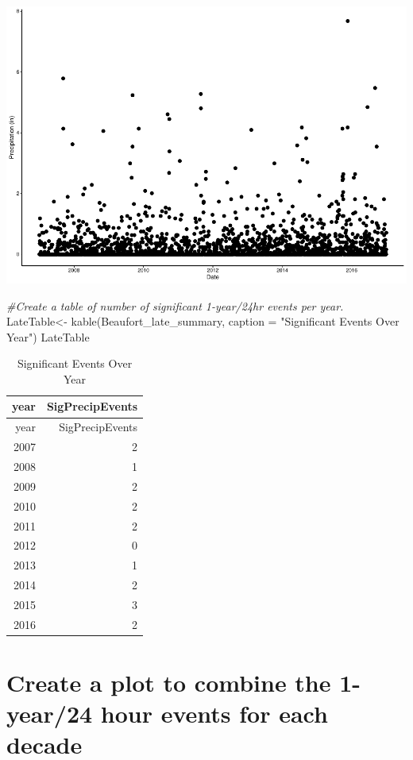 \documentclass[
  12pt,
]{article}
\newenvironment{Shaded}{\begin{snugshade}}{\end{snugshade}}
\newcommand{\AttributeTok}[1]{\textcolor[rgb]{0.77,0.63,0.00}{#1}}
\newcommand{\CommentTok}[1]{\textcolor[rgb]{0.56,0.35,0.01}{\textit{#1}}}
\newcommand{\FunctionTok}[1]{\textcolor[rgb]{0.00,0.00,0.00}{#1}}
\newcommand{\NormalTok}[1]{#1}
\newcommand{\OtherTok}[1]{\textcolor[rgb]{0.56,0.35,0.01}{#1}}
\newcommand{\StringTok}[1]{\textcolor[rgb]{0.31,0.60,0.02}{#1}}
\begin{document}
\includegraphics{Project_Template_TLK_files/figure-latex/late-2.pdf}

\begin{Shaded}
\begin{Highlighting}[]
\CommentTok{\#Create a table of number of significant 1{-}year/24hr events per year.}
\NormalTok{LateTable}\OtherTok{\textless{}{-}} \FunctionTok{kable}\NormalTok{(Beaufort\_late\_summary, }\AttributeTok{caption =} \StringTok{"Significant Events Over Year"}\NormalTok{)}
\NormalTok{LateTable}
\end{Highlighting}
\end{Shaded}

\begin{longtable}[]{@{}rr@{}}
\caption{Significant Events Over Year}\tabularnewline
\toprule
year & SigPrecipEvents \\
\midrule
\endfirsthead
\toprule
year & SigPrecipEvents \\
\midrule
\endhead
2007 & 2 \\
2008 & 1 \\
2009 & 2 \\
2010 & 2 \\
2011 & 2 \\
2012 & 0 \\
2013 & 1 \\
2014 & 2 \\
2015 & 3 \\
2016 & 2 \\
\bottomrule
\end{longtable}

\hypertarget{create-a-plot-to-combine-the-1-year24-hour-events-for-each-decade}{%
\section{Create a plot to combine the 1-year/24 hour events for each
decade}\label{create-a-plot-to-combine-the-1-year24-hour-events-for-each-decade}}
\end{document}
